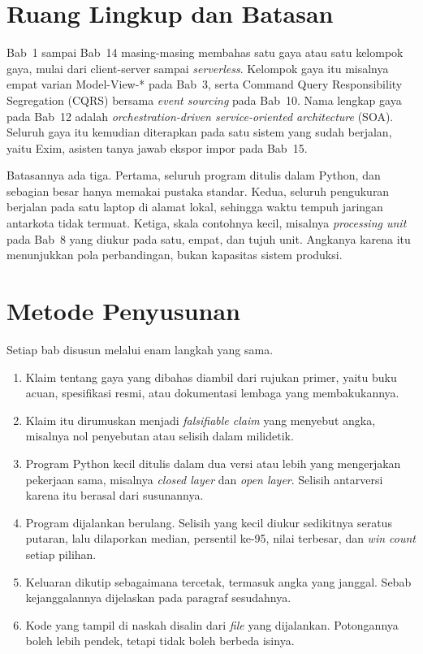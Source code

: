 \section*{Ruang Lingkup dan Batasan}

Bab~1 sampai Bab~14 masing-masing membahas satu gaya atau satu kelompok gaya,
mulai dari client-server sampai \textit{serverless}. Kelompok gaya itu misalnya
empat varian Model-View-* pada Bab~3, serta Command Query Responsibility
Segregation (CQRS) bersama \textit{event sourcing} pada Bab~10. Nama lengkap gaya
pada Bab~12 adalah \textit{orchestration-driven service-oriented architecture}
(SOA). Seluruh gaya itu kemudian diterapkan pada satu sistem yang sudah berjalan,
yaitu Exim, asisten tanya jawab ekspor impor pada Bab~15.

Batasannya ada tiga. Pertama, seluruh program ditulis dalam Python, dan sebagian
besar hanya memakai pustaka standar. Kedua, seluruh pengukuran berjalan pada
satu laptop di alamat lokal, sehingga waktu tempuh jaringan antarkota tidak
termuat. Ketiga, skala contohnya kecil, misalnya \textit{processing unit} pada
Bab~8 yang diukur pada satu, empat, dan tujuh unit. Angkanya karena itu
menunjukkan pola perbandingan, bukan kapasitas sistem produksi.

\section*{Metode Penyusunan}

Setiap bab disusun melalui enam langkah yang sama.

\begin{enumerate}
  \item Klaim tentang gaya yang dibahas diambil dari rujukan primer, yaitu buku
        acuan, spesifikasi resmi, atau dokumentasi lembaga yang membakukannya.
  \item Klaim itu dirumuskan menjadi \textit{falsifiable claim} yang menyebut
        angka, misalnya nol penyebutan atau selisih dalam milidetik.
  \item Program Python kecil ditulis dalam dua versi atau lebih yang
        mengerjakan pekerjaan sama, misalnya \textit{closed layer} dan
        \textit{open layer}. Selisih antarversi karena itu berasal dari
        susunannya.
  \item Program dijalankan berulang. Selisih yang kecil diukur sedikitnya
        seratus putaran, lalu dilaporkan median, persentil ke-95, nilai
        terbesar, dan \textit{win count} setiap pilihan.
  \item Keluaran dikutip sebagaimana tercetak, termasuk angka yang janggal.
        Sebab kejanggalannya dijelaskan pada paragraf sesudahnya.
  \item Kode yang tampil di naskah disalin dari \textit{file} yang dijalankan.
        Potongannya boleh lebih pendek, tetapi tidak boleh berbeda isinya.
\end{enumerate}

